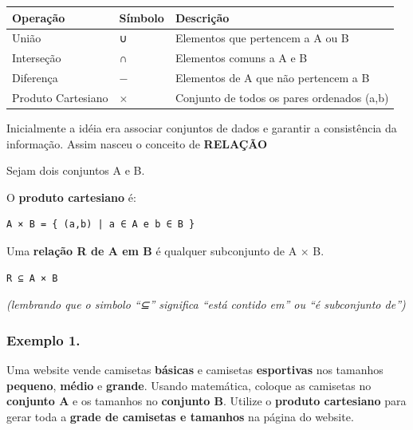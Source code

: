 \documentclass[
]{book}
\begin{document}
\begin{longtable}[]{@{}
  >{\raggedright\arraybackslash}p{}
  >{\raggedright\arraybackslash}p{}
  >{\raggedright\arraybackslash}p{}@{}}
\toprule\noalign{}
\begin{minipage}[b]{\linewidth}\raggedright
Operação
\end{minipage} & \begin{minipage}[b]{\linewidth}\raggedright
Símbolo
\end{minipage} & \begin{minipage}[b]{\linewidth}\raggedright
Descrição
\end{minipage} \\
\midrule\noalign{}
\endhead
\bottomrule\noalign{}
\endlastfoot
União & ∪ & Elementos que pertencem a A ou B \\
Interseção & ∩ & Elementos comuns a A e B \\
Diferença & − & Elementos de A que não pertencem a B \\
Produto Cartesiano & × & Conjunto de todos os pares ordenados (a,b) \\
\end{longtable}

Inicialmente a idéia era associar conjuntos de dados e garantir a consistência da informação. Assim nasceu o conceito de \textbf{RELAÇÃO}

Sejam dois conjuntos A e B.

O \textbf{produto cartesiano} é:

\begin{verbatim}
A × B = { (a,b) | a ∈ A e b ∈ B }
\end{verbatim}

Uma \textbf{relação R de A em B} é qualquer subconjunto de A × B.

\begin{verbatim}
R ⊆ A × B
\end{verbatim}

\emph{(lembrando que o simbolo ``⊆'' significa ``está contido em'' ou ``é subconjunto de'')}

\subsubsection{Exemplo 1.}\label{exemplo-1.}

Uma website vende camisetas \textbf{básicas} e camisetas \textbf{esportivas} nos tamanhos \textbf{pequeno}, \textbf{médio} e \textbf{grande}. Usando matemática, coloque as camisetas no \textbf{conjunto A} e os tamanhos no \textbf{conjunto B}. Utilize o \textbf{produto cartesiano} para gerar toda a \textbf{grade de camisetas e tamanhos} na página do website.
\end{document}
